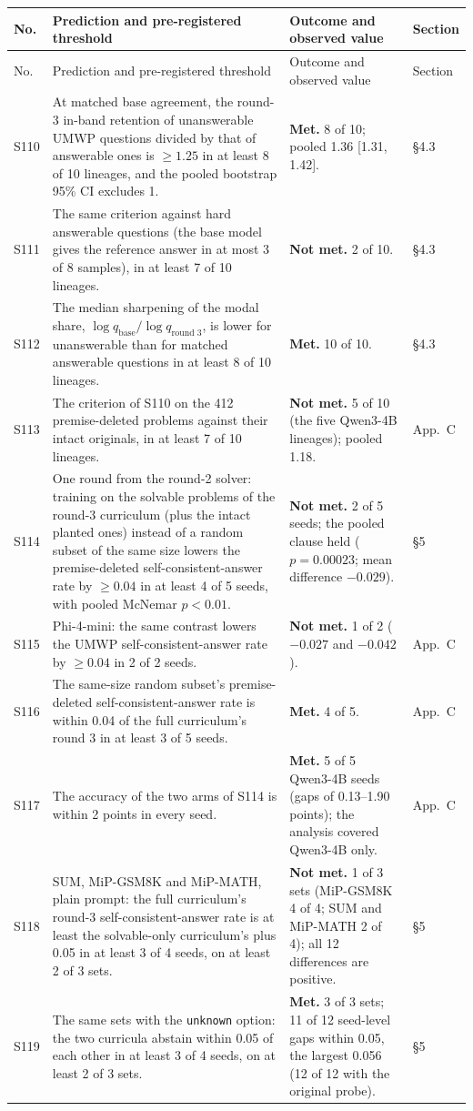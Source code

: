 \documentclass[10pt,a4paper]{article}
\newcommand{\unk}{\texttt{unknown}}
\newcommand{\met}{\textbf{Met.}}
\newcommand{\nmet}{\textbf{Not met.}}
\begin{document}
\begingroup\small
\begin{longtable}{@{}L{0.9cm}L{7.8cm}L{6.1cm}L{1.3cm}@{}}
\toprule
No. & Prediction and pre-registered threshold & Outcome and observed value & Section \\
\midrule
\endfirsthead
\toprule
No. & Prediction and pre-registered threshold & Outcome and observed value & Section \\
\midrule
\endhead
\bottomrule
\endfoot
S110 & At matched base agreement, the round-3 in-band retention of unanswerable UMWP questions divided by that of answerable ones is $\ge 1.25$ in at least 8 of 10 lineages, and the pooled bootstrap 95\% CI excludes 1. & \met{} 8 of 10; pooled 1.36 [1.31, 1.42]. & \S4.3 \\
S111 & The same criterion against hard answerable questions (the base model gives the reference answer in at most 3 of 8 samples), in at least 7 of 10 lineages. & \nmet{} 2 of 10. & \S4.3 \\
S112 & The median sharpening of the modal share, $\log q_{\text{base}} / \log q_{\text{round 3}}$, is lower for unanswerable than for matched answerable questions in at least 8 of 10 lineages. & \met{} 10 of 10. & \S4.3 \\
S113 & The criterion of S110 on the 412 premise-deleted problems against their intact originals, in at least 7 of 10 lineages. & \nmet{} 5 of 10 (the five Qwen3-4B lineages); pooled 1.18. & App.~C \\
S114 & One round from the round-2 solver: training on the solvable problems of the round-3 curriculum (plus the intact planted ones) instead of a random subset of the same size lowers the premise-deleted self-consistent-answer rate by $\ge 0.04$ in at least 4 of 5 seeds, with pooled McNemar $p < 0.01$. & \nmet{} 2 of 5 seeds; the pooled clause held ($p = 0.00023$; mean difference $-0.029$). & \S5 \\
S115 & Phi-4-mini: the same contrast lowers the UMWP self-consistent-answer rate by $\ge 0.04$ in 2 of 2 seeds. & \nmet{} 1 of 2 ($-0.027$ and $-0.042$). & App.~C \\
S116 & The same-size random subset's premise-deleted self-consistent-answer rate is within 0.04 of the full curriculum's round 3 in at least 3 of 5 seeds. & \met{} 4 of 5. & App.~C \\
S117 & The accuracy of the two arms of S114 is within 2 points in every seed. & \met{} 5 of 5 Qwen3-4B seeds (gaps of 0.13--1.90 points); the analysis covered Qwen3-4B only. & App.~C \\
S118 & SUM, MiP-GSM8K and MiP-MATH, plain prompt: the full curriculum's round-3 self-consistent-answer rate is at least the solvable-only curriculum's plus 0.05 in at least 3 of 4 seeds, on at least 2 of 3 sets. & \nmet{} 1 of 3 sets (MiP-GSM8K 4 of 4; SUM and MiP-MATH 2 of 4); all 12 differences are positive. & \S5 \\
S119 & The same sets with the \unk{} option: the two curricula abstain within 0.05 of each other in at least 3 of 4 seeds, on at least 2 of 3 sets. & \met{} 3 of 3 sets; 11 of 12 seed-level gaps within 0.05, the largest 0.056 (12 of 12 with the original probe). & \S5 \\
\end{longtable}
\endgroup
\end{document}
